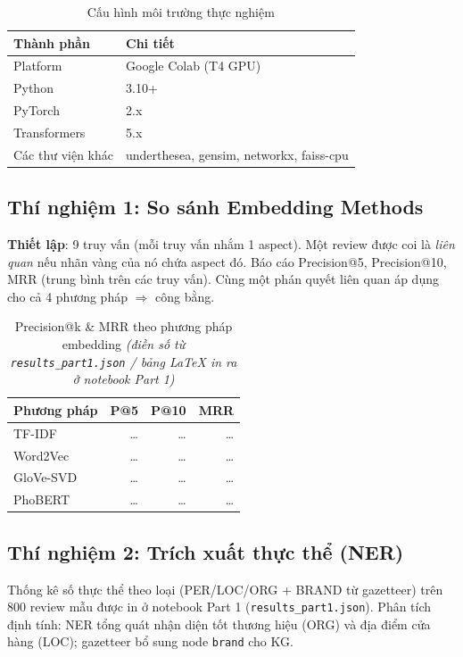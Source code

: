 \documentclass[12pt,a4paper]{article}
\begin{document}
\begin{table}[H]
\centering
\caption{Cấu hình môi trường thực nghiệm}
\begin{tabular}{ll}
\toprule
\textbf{Thành phần} & \textbf{Chi tiết} \\
\midrule
Platform & Google Colab (T4 GPU) \\
Python & 3.10+ \\
PyTorch & 2.x \\
Transformers & 5.x \\
Các thư viện khác & underthesea, gensim, networkx, faiss-cpu \\
\bottomrule
\end{tabular}
\end{table}

\subsection{Thí nghiệm 1: So sánh Embedding Methods}
\label{sec:exp1}

\textbf{Thiết lập}: 9 truy vấn (mỗi truy vấn nhắm 1 aspect). Một review được coi là \textit{liên quan} nếu nhãn vàng của nó chứa aspect đó. Báo cáo Precision@5, Precision@10, MRR (trung bình trên các truy vấn). Cùng một phán quyết liên quan áp dụng cho cả 4 phương pháp $\Rightarrow$ công bằng.

\begin{table}[H]
\centering
\caption{Precision@k \& MRR theo phương pháp embedding \textit{(điền số từ \texttt{results\_part1.json} / bảng LaTeX in ra ở notebook Part 1)}}
\begin{tabular}{lrrr}
\toprule
\textbf{Phương pháp} & \textbf{P@5} & \textbf{P@10} & \textbf{MRR} \\
\midrule
TF-IDF     & \dots & \dots & \dots \\
Word2Vec   & \dots & \dots & \dots \\
GloVe-SVD  & \dots & \dots & \dots \\
PhoBERT    & \dots & \dots & \dots \\
\bottomrule
\end{tabular}
\end{table}

\subsection{Thí nghiệm 2: Trích xuất thực thể (NER)}

Thống kê số thực thể theo loại (PER/LOC/ORG + BRAND từ gazetteer) trên 800 review mẫu được in ở notebook Part 1 (\texttt{results\_part1.json}). Phân tích định tính: NER tổng quát nhận diện tốt thương hiệu (ORG) và địa điểm cửa hàng (LOC); gazetteer bổ sung node \texttt{brand} cho KG.
\end{document}
